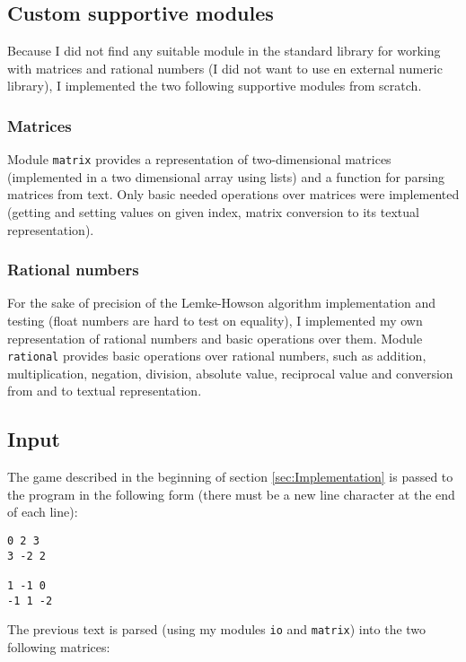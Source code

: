 \documentclass[a4paper,10pt]{article}
\begin{document}
\subsection{Custom supportive modules}

Because I did not find any suitable module in the standard library for working
with matrices and rational numbers (I did not want to use en external numeric
library), I implemented the two following supportive modules from scratch.

\subsubsection{Matrices}

Module \texttt{matrix} provides a representation of two-dimensional matrices
(implemented in a two dimensional array using lists) and a function for parsing
matrices from text. Only basic needed operations over matrices were implemented
(getting and setting values on given index, matrix conversion to its textual
representation).

\subsubsection{Rational numbers}

For the sake of precision of the Lemke-Howson algorithm implementation and
testing (float numbers are hard to test on equality), I implemented my own
representation of rational numbers and basic operations over them. Module
\texttt{rational} provides basic operations over rational numbers, such as
addition, multiplication, negation, division, absolute value, reciprocal value
and conversion from and to textual representation.

\subsection{Input}

The game described in the beginning of section \ref{sec:Implementation} is
passed to the program in the following form (there must be a new line character
at the end of each line):

\begin{verbatim}
0 2 3
3 -2 2

1 -1 0
-1 1 -2
\end{verbatim}

The previous text is parsed (using my modules \texttt{io} and \texttt{matrix})
into the two following matrices:
\end{document}
